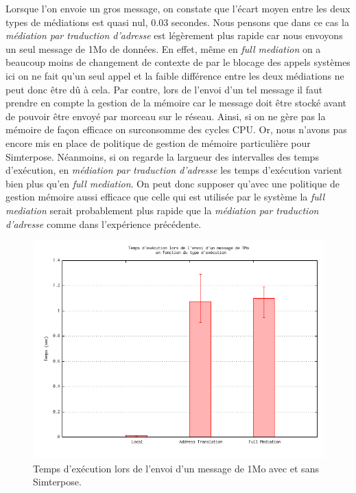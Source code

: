 Lorsque l'on envoie un gros message, on constate que l'écart moyen entre les deux types de médiations est quasi nul, 0.03 secondes. Nous pensons que dans ce cas la \textit{médiation par traduction d'adresse} est légèrement plus rapide car nous envoyons un seul message de 1Mo de données. En effet, même en \textit{full mediation} on a beaucoup moins de changement de contexte de par le blocage des appels systèmes ici on ne fait qu'un seul appel et la faible différence entre les deux médiations ne peut donc être dû à cela. Par contre, lors de l'envoi d'un tel message il faut prendre en compte la gestion de la mémoire car le message doit être stocké avant de pouvoir être envoyé par morceau sur le réseau. Ainsi, si on ne gère pas la mémoire de façon efficace on surconsomme des cycles CPU. Or, nous n'avons pas encore mis en place de politique de gestion de mémoire particulière pour Simterpose. Néanmoins, si on regarde la largueur des intervalles des temps d'exécution, en \textit{médiation par traduction d'adresse} les temps d'exécution varient bien plus qu'en \textit{full mediation}. On peut donc supposer qu'avec une politique de gestion mémoire aussi efficace que celle qui est utilisée par le système la \textit{full mediation} serait probablement plus rapide que la \textit{médiation par traduction d'adresse} comme dans l'expérience précédente.

\begin{figure}
  \centering
    \includegraphics[scale=0.5]{mesures/graph/big.png}
    \caption{Temps d'exécution lors de l'envoi d'un message de 1Mo avec et sans Simterpose.}
    \label{Network_Big}
\end{figure}

